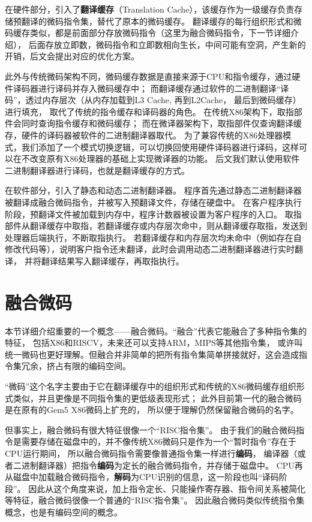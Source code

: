 在硬件部分，引入了\textbf{翻译缓存}（Translation Cache），该缓存作为一级缓存负责存储预翻译的微码指令集，替代了原本的微码缓存。
翻译缓存的每行组织形式和微码缓存类似，都是前面部分存放微码指令（这里为融合微码指令，下一节详细介绍），
后面存放立即数，微码指令和立即数相向生长，中间可能有空洞，产生新的开销，后文会提出对应的优化方案。

此外与传统微码架构不同，微码缓存数据是直接来源于CPU和指令缓存，通过硬件译码器进行译码并存入微码缓存中；
而翻译缓存通过软件的二进制翻译“译码”，透过内存层次（从内存加载到L3 Cache, 再到L2Cache， 最后到微码缓存）进行填充，
取代了传统的指令缓存和译码器的角色。
在传统X86架构下，取指部件会同时查询指令缓存和微码缓存；
而在微译器架构下，取指部件仅查询翻译缓存，硬件的译码器被软件的二进制翻译器取代。
为了兼容传统的X86处理器模式，我们添加了一个模式切换逻辑，可以切换回使用硬件译码器进行译码，这样可以在不改变原有X86处理器的基础上实现微译器的功能。
后文我们默认使用软件二进制翻译器进行译码，也就是翻译缓存的方式。


在软件部分，引入了静态和动态二进制翻译器。
程序首先通过静态二进制翻译器被翻译成融合微码指令，并被写入预翻译文件，存储在硬盘中。
在客户程序执行阶段，预翻译文件被加载到内存中，程序计数器被设置为客户程序的入口。
取指部件从翻译缓存中取指，若翻译缓存或内存层次命中，则从翻译缓存取指，发送到处理器后端执行，不断取指执行。
若翻译缓存和内存层次均未命中（例如存在自修改代码等），说明客户指令还未翻译，此时会调用动态二进制翻译器进行实时翻译，
并将翻译结果写入翻译缓存，再取指执行。

\section{融合微码}
本节详细介绍重要的一个概念——融合微码。“融合”代表它能融合了多种指令集的特征，
包括X86和RISCV，未来还可以支持ARM，MIPS等其他指令集，
或许叫统一微码也更好理解。但融合并非简单的把所有指令集简单拼接就好，这会造成指令集冗余，挤占有限的编码空间。

“微码”这个名字主要由于它在翻译缓存中的组织形式和传统的X86微码缓存组织形式类似，并且更像是不同指令集的更低级表现形式；
此外目前第一代的融合微码是在原有的Gem5 X86微码上扩充的，
所以便于理解仍然保留融合微码的名字。

但事实上，融合微码有很大特征很像一个“RISC指令集”。
由于我们的融合微码指令是需要存储在磁盘中的，并不像传统X86微码只是作为一个“暂时指令”存在于CPU运行期间，
所以融合微码指令需要像普通指令集一样进行\textbf{编码}，
编译器（或者二进制翻译器）把指令\textbf{编码}为定长的融合微码指令，并存储于磁盘中。
CPU再从磁盘中加载融合微码指令，\textbf{解码}为CPU识别的信息，这一阶段也叫“译码阶段”。
因此从这个角度来说，加上指令定长、只能操作寄存器、指令间关系被简化等特征，融合微码很像一个普通的“RISC指令集”。
因此融合微码类似传统指令集概念，也是有编码空间的概念。

